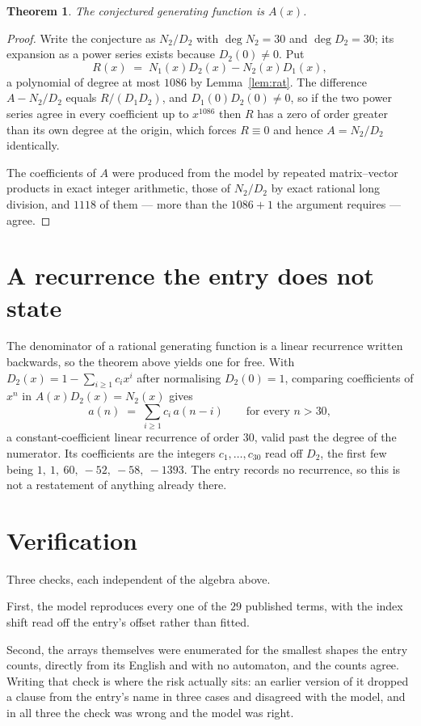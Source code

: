 \documentclass[11pt,a4paper]{article}
\theoremstyle{plain}
\newtheorem{theorem}{Theorem}
\theoremstyle{definition}
\begin{document}
\begin{theorem}
The conjectured generating function is $A(x)$.
\end{theorem}

\begin{proof}
Write the conjecture as $N_2/D_2$ with $\deg N_2=30$ and $\deg D_2=30$; its expansion as a
power series exists because $D_2(0)\neq0$. Put
\[
R(x)\;=\;N_1(x)D_2(x)-N_2(x)D_1(x),
\]
a polynomial of degree at most $1086$ by Lemma~\ref{lem:rat}. The difference
$A-N_2/D_2$ equals $R/(D_1D_2)$, and $D_1(0)D_2(0)\neq0$, so if the two power series agree in
every coefficient up to $x^{1086}$ then $R$ has a zero of order greater than its own
degree at the origin, which forces $R\equiv0$ and hence $A=N_2/D_2$ identically.

The coefficients of $A$ were produced from the model by repeated matrix--vector products in
exact integer arithmetic, those of $N_2/D_2$ by exact rational long division, and $1118$
of them --- more than the $1086+1$ the argument requires --- agree.
\end{proof}

\section{A recurrence the entry does not state}

The denominator of a rational generating function is a linear recurrence written backwards, so
the theorem above yields one for free. With $D_2(x)=1-\sum_{i\ge1}c_ix^i$ after normalising
$D_2(0)=1$, comparing coefficients of $x^n$ in $A(x)D_2(x)=N_2(x)$ gives
\[
a(n)\;=\;\sum_{i\ge1}c_i\,a(n-i)\qquad\text{for every }n>30,
\]
a constant-coefficient linear recurrence of order $30$, valid past the degree of the
numerator. Its coefficients are the integers $c_1,\dots,c_{30}$ read off $D_2$, the first few being $1,\ 1,\ 60,\ -52,\ -58,\ -1393$. The entry records no recurrence, so this is not a restatement of anything
already there.

\section{Verification}

Three checks, each independent of the algebra above.

First, the model reproduces every one of the $29$ published terms, with the index shift
read off the entry's offset rather than fitted.

Second, the arrays themselves were enumerated for the smallest shapes the entry counts,
directly from its English and with no automaton, and the counts agree. Writing that check is
where the risk actually sits: an earlier version of it dropped a clause from the entry's name
in three cases and disagreed with the model, and in all three the check was wrong and the model
was right.
\end{document}
